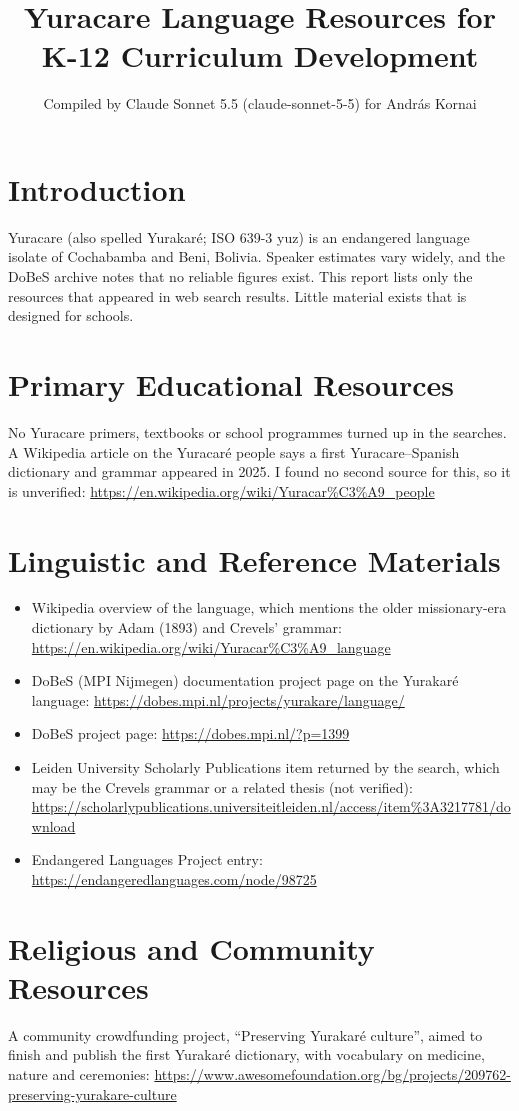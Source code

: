 \documentclass[12pt]{article}
\title{Yuracare Language Resources for K-12 Curriculum Development}
\author{Compiled by Claude Sonnet 5.5 (claude-sonnet-5-5) for Andr\'as Kornai}
\date{}
\begin{document}
\maketitle

\section{Introduction}
Yuracare (also spelled Yurakar\'e; ISO 639-3 yuz) is an endangered language isolate of Cochabamba and Beni, Bolivia. Speaker estimates vary widely, and the DoBeS archive notes that no reliable figures exist. This report lists only the resources that appeared in web search results. Little material exists that is designed for schools.

\section{Primary Educational Resources}
No Yuracare primers, textbooks or school programmes turned up in the searches. A Wikipedia article on the Yuracar\'e people says a first Yuracare--Spanish dictionary and grammar appeared in 2025. I found no second source for this, so it is unverified:
\url{https://en.wikipedia.org/wiki/Yuracar%C3%A9_people}

\section{Linguistic and Reference Materials}
\begin{itemize}
\item Wikipedia overview of the language, which mentions the older missionary-era dictionary by Adam (1893) and Crevels' grammar: \url{https://en.wikipedia.org/wiki/Yuracar%C3%A9_language}
\item DoBeS (MPI Nijmegen) documentation project page on the Yurakar\'e language: \url{https://dobes.mpi.nl/projects/yurakare/language/}
\item DoBeS project page: \url{https://dobes.mpi.nl/?p=1399}
\item Leiden University Scholarly Publications item returned by the search, which may be the Crevels grammar or a related thesis (not verified): \url{https://scholarlypublications.universiteitleiden.nl/access/item%3A3217781/download}
\item Endangered Languages Project entry: \url{https://endangeredlanguages.com/node/98725}
\end{itemize}

\section{Religious and Community Resources}
A community crowdfunding project, ``Preserving Yurakar\'e culture'', aimed to finish and publish the first Yurakar\'e dictionary, with vocabulary on medicine, nature and ceremonies: \url{https://www.awesomefoundation.org/bg/projects/209762-preserving-yurakare-culture}
\end{document}
